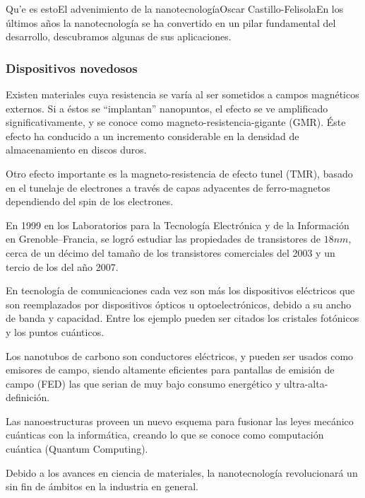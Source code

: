 \begin{Artikel}{Qu'e es esto}{El advenimiento de la nanotecnolog\'ia}{Oscar Castillo-Felisola}{En los \'ultimos a\~nos la nanotecnolog\'ia se ha convertido en un pilar fundamental del desarrollo, descubramos algunas de sus aplicaciones.}
\subsubsection*{Dispositivos novedosos}

Existen materiales cuya resistencia se var\'ia  al ser sometidos a campos magn\'eticos externos. Si a \'estos se ``implantan'' nanopuntos, el efecto se ve amplificado significativamente, y se conoce como magneto-resistencia-gigante (GMR). \'Este efecto ha conducido a un incremento considerable en la densidad de almacenamiento en discos duros.

Otro efecto importante es la magneto-resistencia de efecto tunel (TMR), basado en el tunelaje de electrones a trav\'es de capas adyacentes  de ferro-magnetos dependiendo del spin de los electrones.

En 1999 en los Laboratorios para la Tecnolog\'ia Electr\'onica y de la Informaci\'on en Grenoble--Francia, se logr\'o estudiar las propiedades de transistores de $18 nm$, cerca de un d\'ecimo del tama\~no de los transistores comerciales del 2003 y un tercio de los del a\~no 2007.

En tecnolog\'ia de comunicaciones cada vez son m\'as los dispositivos el\'ectricos que son reemplazados por dispositivos \'opticos u optoelectr\'onicos, debido a su ancho de banda y capacidad. Entre los ejemplo pueden ser citados los cristales fot\'onicos y los puntos cu\'anticos.

Los nanotubos de carbono son conductores el\'ectricos, y pueden ser usados como emisores de campo,%
 siendo altamente eficientes para pantallas de emisi\'on de campo (FED) las que serian de muy bajo consumo energ\'etico y ultra-alta-definici\'on.

Las nanoestructuras proveen un nuevo esquema para fusionar las leyes mec\'anico cu\'anticas con la inform\'atica, creando lo que se conoce como computaci\'on cu\'antica (Quantum Computing).



Debido a los avances en ciencia de materiales, la nanotecnolog\'ia revolucionar\'a un sin fin de \'ambitos en la industria en general.


\end{Artikel}
